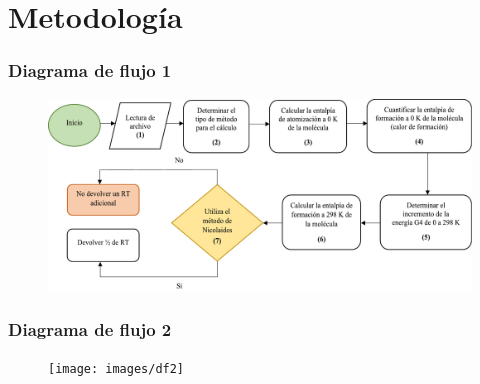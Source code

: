 \documentclass{beamer}
\begin{document}
\section{Metodología}
\begin{frame}
\frametitle{Diagrama de flujo 1}
\begin{center}
\begin{figure}[h!]
\includegraphics[scale=.45]{images/df1}
\end{figure}
\end{center}
\end{frame}
\begin{frame}
\frametitle{Diagrama de flujo 2}
\begin{center}
\begin{figure}[h!]
\texttt{[image: images/df2]}
\end{figure}
\end{center}
\end{frame}
\end{document}
